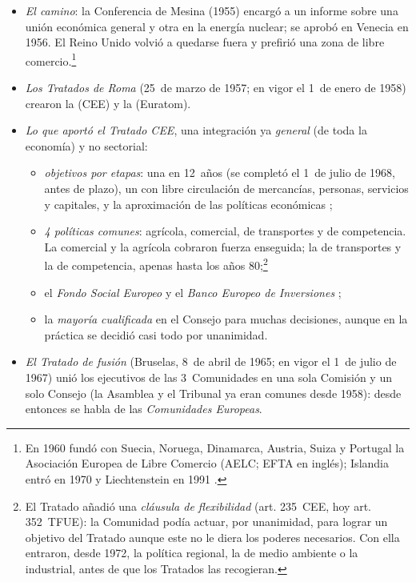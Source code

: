 \documentclass[11pt]{article}
\begin{document}
\begin{itemize}
\item \emph{El camino}: la Conferencia de Mesina (1955) encargó a  un informe sobre una unión económica general y otra en la energía nuclear; se aprobó en Venecia en 1956. El Reino Unido volvió a quedarse fuera y prefirió una zona de libre comercio.\footnote{En 1960 fundó con Suecia, Noruega, Dinamarca, Austria, Suiza y Portugal la Asociación Europea de Libre Comercio (AELC; EFTA en inglés); Islandia entró en 1970 y Liechtenstein en 1991 .}
\item \emph{Los Tratados de Roma} (25~de marzo de 1957; en vigor el 1~de enero de 1958) crearon la  (CEE) y la  (Euratom).
\item \emph{Lo que aportó el Tratado CEE}, una integración ya \emph{general} (de toda la economía) y no sectorial:
  \begin{itemize}
  \item \emph{objetivos por etapas}: una  en 12~años (se completó el 1~de julio de 1968, antes de plazo), un  con libre circulación de mercancías, personas, servicios y capitales, y la aproximación de las políticas económicas ;
  \item \emph{4 políticas comunes}: agrícola, comercial, de transportes y de competencia. La comercial y la agrícola cobraron fuerza enseguida; la de transportes y la de competencia, apenas hasta los años 80;\footnote{El Tratado añadió una \emph{cláusula de flexibilidad} (art. 235~CEE, hoy art. 352~TFUE): la Comunidad podía actuar, por unanimidad, para lograr un objetivo del Tratado aunque este no le diera los poderes necesarios. Con ella entraron, desde 1972, la política regional, la de medio ambiente o la industrial, antes de que los Tratados las recogieran.}
  \item el \emph{Fondo Social Europeo} y el \emph{Banco Europeo de Inversiones} ;
  \item la \emph{mayoría cualificada} en el Consejo para muchas decisiones, aunque en la práctica se decidió casi todo por unanimidad.
  \end{itemize}
\item \emph{El Tratado de fusión} (Bruselas, 8~de abril de 1965; en vigor el 1~de julio de 1967) unió los ejecutivos de las 3~Comunidades en una sola Comisión y un solo Consejo (la Asamblea y el Tribunal ya eran comunes desde 1958): desde entonces se habla de las \emph{Comunidades Europeas}.
\end{itemize}
\end{document}
